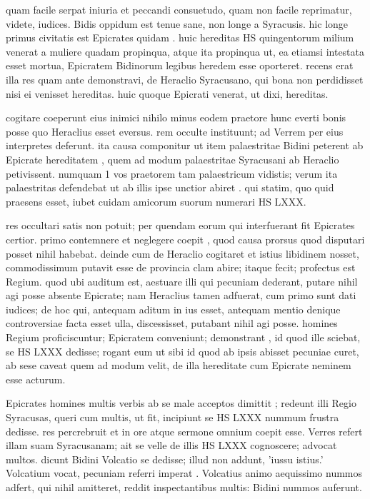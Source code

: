  quam facile serpat iniuria et peccandi consuetudo, quam non facile reprimatur, videte, iudices. Bidis oppidum est tenue sane, non longe a Syracusis. hic longe primus civitatis est Epicrates quidam . huic hereditas HS quingentorum milium venerat a muliere quadam propinqua, atque ita propinqua ut, ea etiamsi intestata esset mortua, Epicratem Bidinorum legibus heredem esse oporteret. recens erat illa res quam ante demonstravi, de Heraclio Syracusano, qui bona non perdidisset nisi ei venisset hereditas. huic quoque Epicrati venerat, ut dixi, hereditas.

 cogitare coeperunt eius inimici nihilo minus eodem praetore hunc everti bonis posse quo Heraclius esset eversus. rem occulte instituunt; ad Verrem per eius interpretes deferunt. ita causa componitur ut item palaestritae Bidini peterent ab Epicrate hereditatem , quem ad modum palaestritae Syracusani ab Heraclio petivissent. numquam 1 vos praetorem tam palaestricum vidistis; verum ita palaestritas defendebat ut ab illis ipse unctior abiret . qui statim, quo quid praesens esset, iubet cuidam amicorum suorum numerari HS LXXX.

 res occultari satis non potuit; per quendam eorum qui interfuerant fit Epicrates certior. primo contemnere et neglegere coepit , quod causa prorsus quod disputari posset nihil habebat. deinde cum de Heraclio cogitaret et istius libidinem nosset, commodissimum putavit esse de provincia clam abire; itaque fecit; profectus est Regium. quod ubi auditum est, aestuare illi qui pecuniam dederant, putare nihil agi posse absente Epicrate; nam Heraclius tamen adfuerat, cum primo sunt dati iudices; de hoc qui, antequam aditum in ius esset, antequam mentio denique controversiae facta esset ulla, discessisset, putabant nihil agi posse. homines Regium proficiscuntur; Epicratem conveniunt; demonstrant , id quod ille sciebat, se HS LXXX dedisse; rogant eum ut sibi id quod ab ipsis abisset pecuniae curet, ab sese caveat quem ad modum velit, de illa hereditate cum Epicrate neminem esse acturum.

 Epicrates homines multis verbis ab se male acceptos dimittit ; redeunt illi Regio Syracusas, queri cum multis, ut fit, incipiunt se HS LXXX nummum frustra dedisse. res percrebruit et in ore atque sermone omnium coepit esse. Verres refert illam suam Syracusanam; ait se velle de illis HS LXXX cognoscere; advocat multos. dicunt Bidini Volcatio se dedisse; illud non addunt, 'iussu istius.' Volcatium vocat, pecuniam referri imperat . Volcatius animo aequissimo nummos adfert, qui nihil amitteret, reddit inspectantibus multis: Bidini nummos auferunt.

